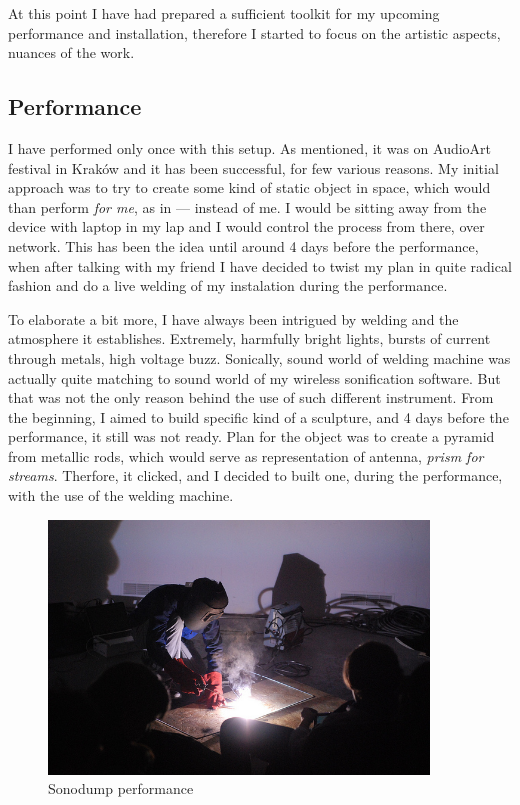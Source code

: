 \documentclass[12pt,a4paper,oneside]{report}
\begin{document}
At this point I have had prepared a sufficient toolkit for my upcoming performance and installation, therefore I started to focus on the artistic aspects, nuances of the work.

\subsection{Performance}
I have performed only once with this setup. As mentioned, it was on AudioArt festival in Kraków and it has been successful, for few various reasons. My initial approach was to try to create some kind of static object in space, which would than perform \emph{for me}, as in --- instead of me. I would be sitting away from the device with laptop in my lap and I would control the process from there, over network. This has been the idea until around 4 days before the performance, when after talking with my friend I have decided to twist my plan in quite radical fashion and do a live welding of my instalation during the performance.

To elaborate a bit more, I have always been intrigued by welding and the atmosphere it establishes. Extremely, harmfully bright lights, bursts of current through metals, high voltage buzz. Sonically, sound world of welding machine was actually quite matching to sound world of my wireless sonification software. But that was not the only reason behind the use of such different instrument. From the beginning, I aimed to build specific kind of a sculpture, and 4 days before the performance, it still was not ready. Plan for the object was to create a pyramid from metallic rods, which would serve as representation of antenna, \textit{prism for streams}. Therfore, it clicked, and I decided to built one, during the performance, with the use of the welding machine.

\begin{figure}  
  \centering
    \includegraphics[width=0.9\textwidth]{img/zvarac}
	\caption{Sonodump performance}
	\label{fig:zvarac}
\end{figure}
\end{document}
